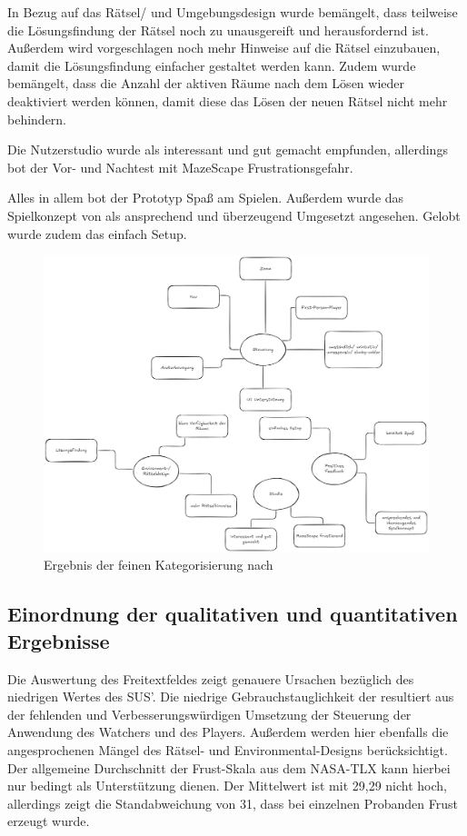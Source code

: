 In Bezug auf das Rätsel/ und Umgebungsdesign wurde bemängelt, dass teilweise die Lösungsfindung der Rätsel noch zu unausgereift und herausfordernd ist. 
Außerdem wird vorgeschlagen noch mehr Hinweise auf die Rätsel einzubauen, damit die Lösungsfindung einfacher gestaltet werden kann. Zudem wurde bemängelt, dass die Anzahl der aktiven Räume nach dem Lösen wieder deaktiviert werden können, damit diese das Lösen der neuen Rätsel nicht mehr behindern.

Die Nutzerstudio wurde als interessant und gut gemacht empfunden, allerdings bot der Vor- und Nachtest mit MazeScape Frustrationsgefahr.

Alles in allem bot der Prototyp Spaß am Spielen. Außerdem wurde das Spielkonzept von  als ansprechend und überzeugend Umgesetzt angesehen. Gelobt wurde zudem das einfach Setup.
\begin{figure}[ht]
\centering
\includegraphics[width=1\linewidth]{content/pictures/Qualitative-Auswertung-Schritt-2.png}
\caption{Ergebnis der feinen Kategorisierung nach \cite{braun_using_2006}}
\label{fig:qualitative-results-end}
\end{figure}


\subsection{Einordnung der qualitativen und quantitativen Ergebnisse}
Die Auswertung des Freitextfeldes zeigt genauere Ursachen bezüglich des niedrigen Wertes des \ac{SUS}'. Die niedrige Gebrauchstauglichkeit der  resultiert aus der fehlenden  und Verbesserungswürdigen Umsetzung der Steuerung der Anwendung des Watchers und des Players. Außerdem werden hier ebenfalls die angesprochenen Mängel des Rätsel- und Environmental-Designs berücksichtigt. Der allgemeine Durchschnitt der Frust-Skala aus dem \ac{NASA-TLX} kann hierbei nur bedingt als Unterstützung dienen. Der Mittelwert ist mit 29,29 nicht hoch, allerdings zeigt die Standabweichung von 31, dass bei einzelnen Probanden Frust erzeugt wurde. 

